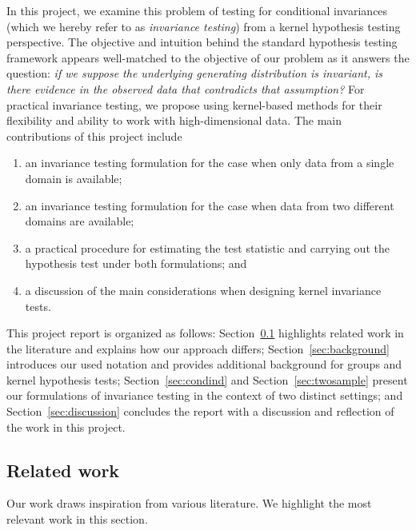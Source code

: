 In this project, we examine this problem of testing for conditional invariances (which we hereby refer to as \textit{invariance testing}) from a kernel hypothesis testing perspective. The objective and intuition behind the standard hypothesis testing framework appears well-matched to the objective of our problem as it answers the question: \textit{if we suppose the underlying generating distribution is invariant, is there evidence in the observed data that contradicts that assumption?} For practical invariance testing, we propose using kernel-based methods for their flexibility and ability to work with high-dimensional data. The main contributions of this project include
\begin{enumerate}

\item
an invariance testing formulation for the case when only data from a single domain is available;

\item
an invariance testing formulation for the case when data from two different domains are available;

\item
a practical procedure for estimating the test statistic and carrying out the hypothesis test under both formulations; and

\item
a discussion of the main considerations when designing kernel invariance tests.

\end{enumerate}

This project report is organized as follows: Section~\ref{sec:related} highlights related work in the literature and explains how our approach differs; Section~\ref{sec:background} introduces our used notation and provides additional background for groups and kernel hypothesis tests; Section~\ref{sec:condind} and Section~\ref{sec:twosample} present our formulations of invariance testing in the context of two distinct settings; and Section~\ref{sec:discussion} concludes the report with a discussion and reflection of the work in this project.


\subsection{Related work}\label{sec:related}

Our work draws inspiration from various literature. We highlight the most relevant work in this section.
\\

